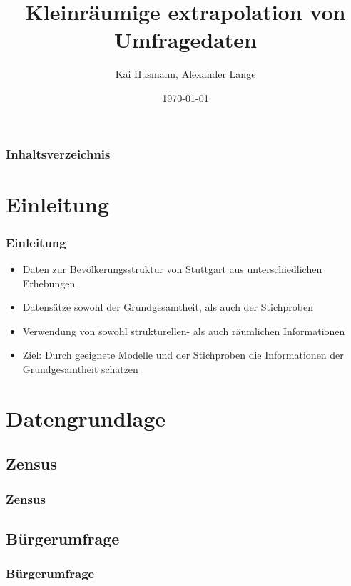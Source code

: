 \documentclass{beamer}
\begin{document}


\title{Kleinräumige extrapolation von Umfragedaten}   
\author{Kai Husmann, Alexander Lange} 
\date{\today}

\begin{frame}
\titlepage
\end{frame}

\begin{frame}
\frametitle{Inhaltsverzeichnis}\tableofcontents
\end{frame}


\section{Einleitung}
\begin{frame}\frametitle{Einleitung} 
\begin{itemize}
\item Daten zur Bevölkerungsstruktur von Stuttgart aus unterschiedlichen Erhebungen
\item Datensätze sowohl der Grundgesamtheit, als auch der Stichproben 
\item Verwendung von sowohl strukturellen- als auch räumlichen Informationen
\item Ziel: Durch geeignete Modelle und der Stichproben die Informationen der Grundgesamtheit schätzen
\end{itemize}
\end{frame}


\section{Datengrundlage} 
\subsection{Zensus}
\begin{frame}\frametitle{Zensus}

\end{frame}

\subsection{Bürgerumfrage}
\begin{frame}\frametitle{Bürgerumfrage}

\end{frame}
\end{document}
